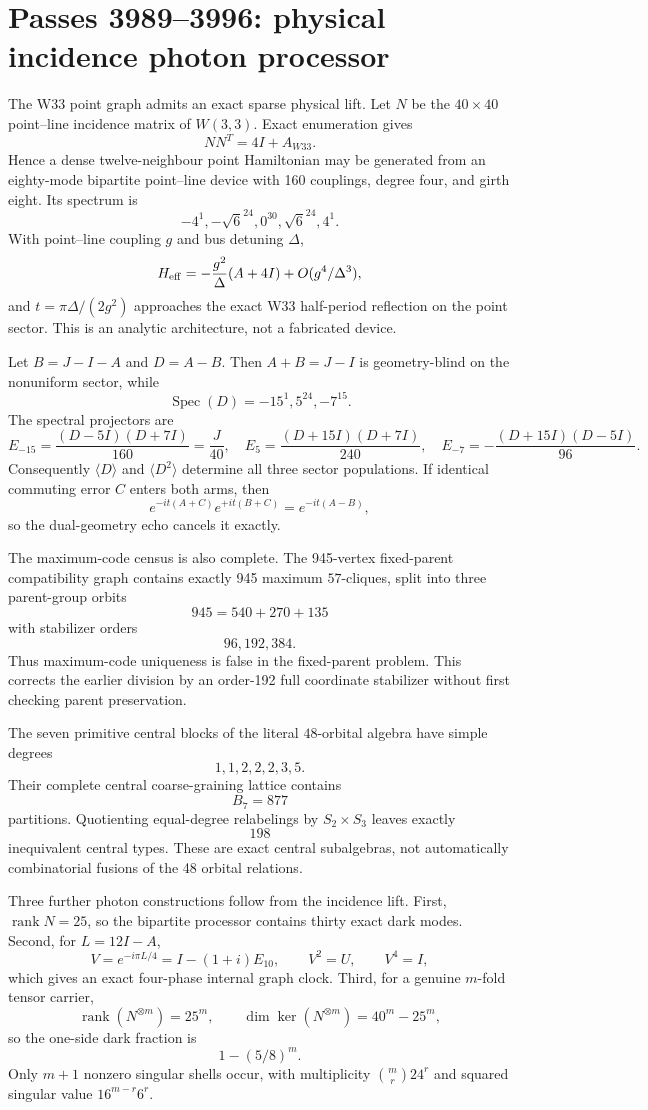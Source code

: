 \section{Passes 3989--3996: physical incidence photon processor}
\label{sec:pass3989-3996}

The W33 point graph admits an exact sparse physical lift.  Let $N$ be the $40\times40$ point--line incidence matrix of $W(3,3)$.  Exact enumeration gives
\[
NN^T=4I+A_{W33}.
\]
Hence a dense twelve-neighbour point Hamiltonian may be generated from an eighty-mode bipartite point--line device with 160 couplings, degree four, and girth eight.  Its spectrum is
\[
-4^1,-\sqrt6^{24},0^{30},\sqrt6^{24},4^1.
\]
With point--line coupling $g$ and bus detuning $\Delta$,
\[
H_{\rm eff}=-\frac{g^2}{\Delta}(A+4I)+O(g^4/\Delta^3),
\]
and $t=\pi\Delta/(2g^2)$ approaches the exact W33 half-period reflection on the point sector.  This is an analytic architecture, not a fabricated device.

Let $B=J-I-A$ and $D=A-B$.  Then $A+B=J-I$ is geometry-blind on the nonuniform sector, while
\[
\operatorname{Spec}(D)=-15^1,5^{24},-7^{15}.
\]
The spectral projectors are
\[
E_{-15}=\frac{(D-5I)(D+7I)}{160}=\frac J{40},
\quad
E_5=\frac{(D+15I)(D+7I)}{240},
\quad
E_{-7}=-\frac{(D+15I)(D-5I)}{96}.
\]
Consequently $\langle D\rangle$ and $\langle D^2\rangle$ determine all three sector populations.  If identical commuting error $C$ enters both arms, then
\[
e^{-it(A+C)}e^{+it(B+C)}=e^{-it(A-B)},
\]
so the dual-geometry echo cancels it exactly.

The maximum-code census is also complete.  The 945-vertex fixed-parent compatibility graph contains exactly 945 maximum $57$-cliques, split into three parent-group orbits
\[
\boxed{945=540+270+135}
\]
with stabilizer orders
\[
\boxed{96,192,384}.
\]
Thus maximum-code uniqueness is false in the fixed-parent problem.  This corrects the earlier division by an order-192 full coordinate stabilizer without first checking parent preservation.

The seven primitive central blocks of the literal $48$-orbital algebra have simple degrees
\[
1,1,2,2,2,3,5.
\]
Their complete central coarse-graining lattice contains
\[
B_7=877
\]
partitions.  Quotienting equal-degree relabelings by $S_2\times S_3$ leaves exactly
\[
\boxed{198}
\]
inequivalent central types.  These are exact central subalgebras, not automatically combinatorial fusions of the 48 orbital relations.

Three further photon constructions follow from the incidence lift.  First, $\operatorname{rank}N=25$, so the bipartite processor contains thirty exact dark modes.  Second, for $L=12I-A$,
\[
V=e^{-i\pi L/4}=I-(1+i)E_{10},
\qquad V^2=U,
\qquad V^4=I,
\]
which gives an exact four-phase internal graph clock.  Third, for a genuine $m$-fold tensor carrier,
\[
\operatorname{rank}(N^{\otimes m})=25^m,
\qquad
\dim\ker(N^{\otimes m})=40^m-25^m,
\]
so the one-side dark fraction is
\[
\boxed{1-(5/8)^m}.
\]
Only $m+1$ nonzero singular shells occur, with multiplicity $\binom mr24^r$ and squared singular value $16^{m-r}6^r$.

